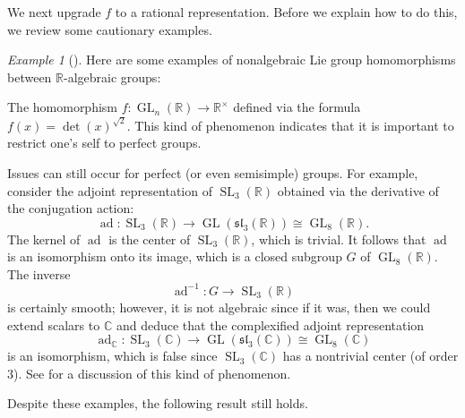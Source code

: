 \documentclass[11pt]{article}
\numberwithin{equation}{section}
\theoremstyle{plain}
\theoremstyle{definition}
\theoremstyle{remark}
\newtheorem{eg}[theorem]{Example}
\newenvironment{example}[1][]{\begin{eg}[#1] \pushQED{\qed}}{\popQED \end{eg}}
\DeclareMathOperator{\GL}{GL}
\DeclareMathOperator{\SL}{SL}
\newcommand\fsl{\ensuremath{\mathfrak{sl}}}
\DeclareMathOperator{\ad}{ad}
\newcommand\R{\ensuremath{\mathbb{R}}}
\newcommand\C{\ensuremath{\mathbb{C}}}
\begin{document}
We next upgrade $f$ to a rational representation.  Before we explain how to do this,
we review some cautionary examples.

\begin{example}
\label{example:nonalgebraic}
Here are some examples of nonalgebraic Lie group homomorphisms between $\R$-algebraic groups:
\begin{compactitem}
\item The homomorphism $f\colon \GL_n(\R) \rightarrow \R^{\times}$ defined via the formula
$f(x) = \det(x)^{\sqrt{2}}$.  This kind of phenomenon indicates that it is important to restrict
one's self to perfect groups.
\item Issues can still occur for perfect (or even semisimple) groups.  For example, consider
the adjoint representation of $\SL_3(\R)$ obtained via the derivative of the conjugation action:
\[\ad\colon \SL_3(\R) \longrightarrow \GL(\fsl_3(\R)) \cong \GL_8(\R).\]
The kernel of $\ad$ is the center of $\SL_3(\R)$, which is trivial.  It follows that $\ad$ is an isomorphism
onto its image, which is a closed subgroup $G$ of $\GL_8(\R)$.  The inverse
\[\ad^{-1}\colon G \longrightarrow \SL_3(\R)\]
is certainly smooth; however, it is not algebraic since if it was, then we could extend scalars
to $\C$ and deduce that the complexified adjoint representation
\[\ad_{\C}\colon \SL_3(\C) \longrightarrow \GL(\fsl_3(\C)) \cong \GL_8(\C)\]
is an isomorphism, which is false since $\SL_3(\C)$ has a nontrivial center (of order $3$).  See
\cite{LeeWu} for a discussion of this kind of phenomenon.\qedhere
\end{compactitem}
\end{example}

Despite these examples, the following result still holds.
\end{document}
